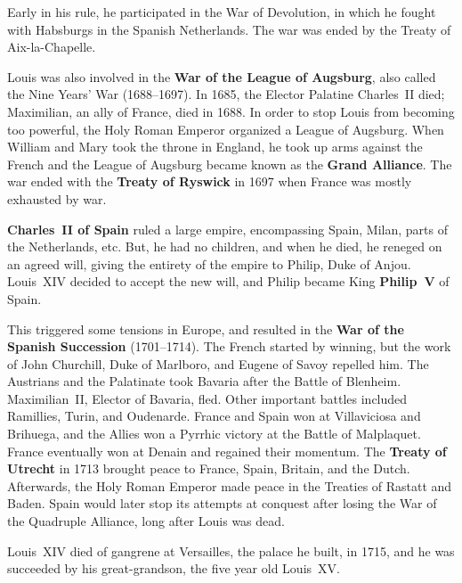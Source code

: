 Early in his rule, he participated in the War of Devolution,
in which he fought with Habsburgs in the Spanish Netherlands.
The war was ended by the Treaty of Aix-la-Chapelle.

Louis was also involved in the \textbf{War of the League of Augsburg},
also called the Nine Years' War (1688--1697).
In 1685, the Elector Palatine Charles~II died; Maximilian, an ally of France, died in 1688.
In order to stop Louis from becoming too powerful, the Holy Roman Emperor organized a League of Augsburg.
When William and Mary took the throne in England,
he took up arms against the French and the League of Augsburg became known as the \textbf{Grand Alliance}.
The war ended with the \textbf{Treaty of Ryswick} in 1697 when France was mostly exhausted by war.

\textbf{Charles~II of Spain} ruled a large empire, encompassing Spain, Milan, parts of the Netherlands, etc.
But, he had no children, and when he died, he reneged on an agreed will,
giving the entirety of the empire to Philip, Duke of Anjou.
Louis~XIV decided to accept the new will, and Philip became King \textbf{Philip~V} of Spain.

This triggered some tensions in Europe, and resulted in the \textbf{War of the Spanish Succession} (1701--1714).
The French started by winning, but the work of John Churchill, Duke of Marlboro, and Eugene of Savoy repelled him.
The Austrians and the Palatinate took Bavaria after the Battle of Blenheim.
Maximilian~II, Elector of Bavaria, fled.
Other important battles included Ramillies, Turin, and Oudenarde.
France and Spain won at Villaviciosa and Brihuega,
and the Allies won a Pyrrhic victory at the Battle of Malplaquet.
France eventually won at Denain and regained their momentum.
The \textbf{Treaty of Utrecht} in 1713 brought peace to France, Spain, Britain, and the Dutch.
Afterwards, the Holy Roman Emperor made peace in the Treaties of Rastatt and Baden.
Spain would later stop its attempts at conquest after losing the War of the Quadruple Alliance,
long after Louis was dead.

Louis~XIV died of gangrene at Versailles, the palace he built, in 1715,
and he was succeeded by his great-grandson, the five year old Louis~XV\@.
